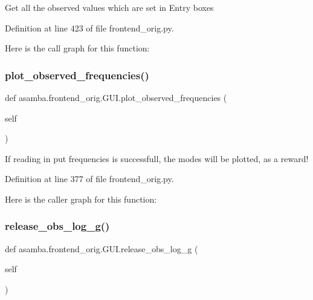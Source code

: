 \begin{DoxyVerb}Get all the observed values which are set in Entry boxes \end{DoxyVerb}
 

Definition at line 423 of file frontend\+\_\+orig.\+py.

Here is the call graph for this function\+:
\mbox{\label{classasamba_1_1frontend__orig_1_1_g_u_i_abb9e1670526f7bf28a6f2317e14546c0}} 
\subsubsection{\texorpdfstring{plot\+\_\+observed\+\_\+frequencies()}{plot\_observed\_frequencies()}}
{\footnotesize\ttfamily def asamba.\+frontend\+\_\+orig.\+G\+U\+I.\+plot\+\_\+observed\+\_\+frequencies (\begin{DoxyParamCaption}\item[{}]{self }\end{DoxyParamCaption})}

\begin{DoxyVerb}If reading in put frequencies is successfull, the modes will be plotted, as a reward! \end{DoxyVerb}
 

Definition at line 377 of file frontend\+\_\+orig.\+py.

Here is the caller graph for this function\+:
\mbox{\label{classasamba_1_1frontend__orig_1_1_g_u_i_a23fecf5b0f52f4b0c420118e8572c435}} 
\subsubsection{\texorpdfstring{release\+\_\+obs\+\_\+log\+\_\+g()}{release\_obs\_log\_g()}}
{\footnotesize\ttfamily def asamba.\+frontend\+\_\+orig.\+G\+U\+I.\+release\+\_\+obs\+\_\+log\+\_\+g (\begin{DoxyParamCaption}\item[{}]{self }\end{DoxyParamCaption})}

